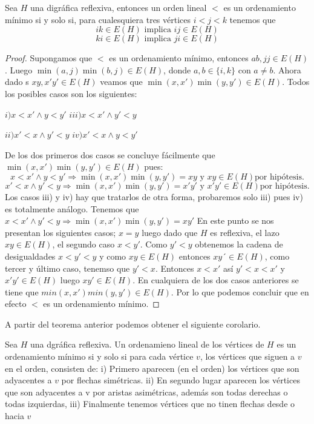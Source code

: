 \begin{teorema}
\label{teo:OrdLnl}
    Sea $H$ una digráfica reflexiva, entonces un orden lineal $<$ es un ordenamiento m\'inimo si y solo si, para cualesquiera tres vértices $i<j<k$ tenemos que 
    $$ik\in E(H) \text{ implica } ij\in E(H)$$
    $$ki\in E(H) \text{ implica } ji\in E(H)$$
\end{teorema}
\begin{proof}
    Supongamos que $<$ es un ordenamiento m\'inimo, entonces $ab,jj\in E(H)$. Luego $\min(a,j) \min(b,j)\in E(H)$, donde $a,b \in \{ i,k\}$ con $a \neq b$.
    Ahora dado s $xy, x'y' \in E(H)$ veamos que $\min(x,x') \min(y,y')\in E(H)$. Todos los posibles casos son los siguientes:
    
    $ i) x<x' \wedge y<y' $ \hspace{1cm} $iii) x<x' \wedge y'<y $
    
    $ ii) x'<x \wedge y'<y $ \hspace{1cm} $iv) x'<x \wedge y<y' $

    De los dos primeros dos casos se concluye fácilmente que $\min(x,x') \min(y,y')\in E(H)$ pues:
    $$x<x' \wedge y<y' \Rightarrow \min(x,x') \min(y,y')=xy \text{ y } xy\in E(H) \text{por hipótesis.}$$
    $$x'<x \wedge y'<y \Rightarrow \min(x,x') \min(y,y')=x'y' \text{ y } x'y'\in E(H) \text{por hipótesis.}$$
    Los casos iii) y iv) hay que tratarlos de otra forma, probaremos solo iii) pues iv) es totalmente análogo.
    Tenemos que $x<x' \wedge y'<y\Rightarrow \min(x,x') \min(y,y')=xy' $ En este punto se nos presentan los siguientes casos; $x=y$ luego dado que $H$ es reflexiva, el lazo $xy\in E(H)$, el segundo caso $x<y' $. Como $y'<y$ obtenemos la cadena de desigualdades $x<y'<y$ y como $xy\in E(H)$ entonces $xy´\in E(H)$, como tercer y último caso, tenemso que $y'<x$. Entonces $x<x'$ así $y'<x<x'$ y $x'y'\in E(H)$ luego $xy'\in E(H)$. En cualquiera de los dos casos anteriores se tiene que $min(x,x')min(y,y')\in E(H)$. Por lo que podemos concluir que en efecto $<$ es un ordenamiento mínimo.
\end{proof}

A partir del teorema anterior podemos obtener el siguiente corolario.
\begin{corolario}
    Sea $H$ una dgráfica reflexiva. Un ordenamieno lineal de los vértices de $H$ es un ordenamiento mínimo si y solo si para cada vértice $v$, los vértices que siguen a $v$ en el orden, consisten de: i) Primero aparecen (en el orden) los vértices que son adyacentes a $v$ por flechas simétricas. ii) En segundo lugar aparecen los vértices que son adyacentes a v por aristas asimétricas, además son todas derechas o todas izquierdas, iii) Finalmente tenemos vértices que no tinen flechas desde o hacia $v$
\end{corolario}

